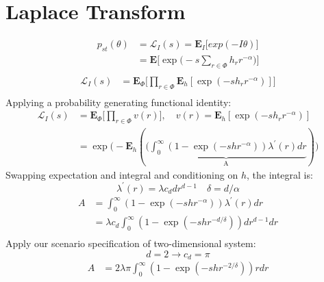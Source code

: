 \section{Laplace Transform}\label{app:Interference_LT}
%
\begin{equation}
  \begin{split}
p_{st}(\theta) &= \mathcal{L}_I (s) = \textbf{E}_I \big[ exp(-I \theta) \big] \\
&= \textbf{E} \Big[ \exp \big(-s\sum_{r \in \Phi} h_r r^{-\alpha}\big) \Big] \\
\end{split}
\end{equation}
%
\begin{equation}
  \begin{split}
    \mathcal{L}_I (s) &= \textbf{E}_\Phi \Big[ \prod_{r \in \Phi} \textbf{E}_h [\exp(-sh_rr^{-\alpha})] \Big] \\
  \end{split}
\end{equation}
%
Applying a probability generating functional identity:
%
\begin{equation}
  \begin{split}
    \mathcal{L}_I (s) &= \textbf{E}_\Phi \Big[ \prod_{r \in \Phi} v(r) \Big],\quad v(r) = \textbf{E}_h [\exp(-sh_rr^{-\alpha})] \\
    & = \exp \Big( -\textbf{E}_h(\underbrace{(\int_0^\infty (1-\exp(-shr^{-\alpha}))\lambda^{'}(r)dr}_\text{A} ) \Big)
  \end{split}
\end{equation}
%
Swapping expectation and integral and conditioning on $h$, the integral is:
%
\begin{equation}
  \lambda^{'}(r) = \lambda c_d d r^{d-1} \quad \delta = d/\alpha
\end{equation}
%
\begin{equation}
  \begin{split}
    A &= \int_0^\infty (1-\exp(-shr^{-\alpha}))\lambda^{'}(r)dr \\
    &= \lambda c_d \int_0^\infty (1-\exp(-shr^{-d/\delta}))dr^{d-1}dr \\
  \end{split}
\end{equation}
%
Apply our scenario specification of two-dimensional system:
%
\begin{equation}
  d = 2 \rightarrow c_d=\pi
\end{equation}
%
\begin{equation}
  \begin{split}
A &= 2 \lambda \pi \int_0^\infty (1-\exp(-shr^{-2/\delta})) r dr\\
\end{split}
\end{equation}
